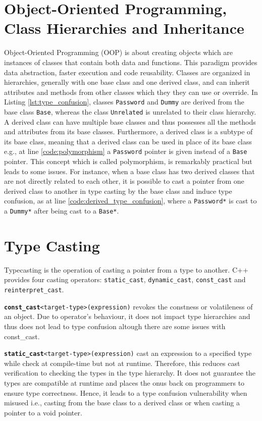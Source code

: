 \documentclass[a4paper,11pt,oneside]{report}
\begin{document}
\section{Object-Oriented Programming, Class Hierarchies and Inheritance} \label{sec:cpp_oop}
Object-Oriented Programming (OOP) is about creating objects which are instances of classes that contain both data and functions. This paradigm provides
data abstraction, faster execution and code reusability. Classes are organized in hierarchies, generally with one base class and one derived class, and can inherit attributes and methods from other classes which they
they can use or override. In Listing \autoref{lst:type_confusion}, classes \texttt{Password} and \texttt{Dummy} are derived from the base class \texttt{Base}, 
whereas the class \texttt{Unrelated} is unrelated to their class hierarchy.
A derived class can have multiple base classes and thus possesses all the methods and attributes from its base classes. 
Furthermore, a derived class is a subtype of its base class, meaning that a derived class can be used in place of its base class e.g., at line \ref{code:polymorphism}
a \texttt{Password} pointer is given instead of a \texttt{Base} pointer. This concept which is called 
polymorphism, is remarkably practical but leads to some issues. For instance, when a base class has two derived classes that are not directly related to each other, 
it is possible to cast a pointer from one derived class to another in type casting by the base class and induce type confusion, 
as at line \ref{code:derived_type_confusion}, where a \texttt{Password*} is cast to a \texttt{Dummy*} after being cast to a \texttt{Base*}. 

\section{Type Casting} \label{sec:cpp_type_casting}
Typecasting is the operation of casting a pointer from a type to another. C++ provides four casting operators: \texttt{static\_cast}, \texttt{dynamic\_cast}, 
\texttt{const\_cast} and \texttt{reinterpret\_cast}. 

\texttt{\textbf{const\_cast}<target-type>(expression)} revokes the constness or volatileness of an object. Due to operator's behaviour, it does not impact type hierarchies and 
thus does not lead to type confusion altough there are some issues with const\_cast.

\texttt{\textbf{static\_cast}<target-type>(expression)} cast an expression to a specified type while check at compile-time but not at runtime. Therefore, this reduces cast verification to checking the types 
in the type hierarchy. It does not guarantee the types are compatible at runtime and places the onus back on programmers to ensure type correctness. Hence, it leads to a type confusion vulnerability when misused i.e.,
casting from the base class to a derived class or when casting a pointer to a void pointer.
\end{document}
